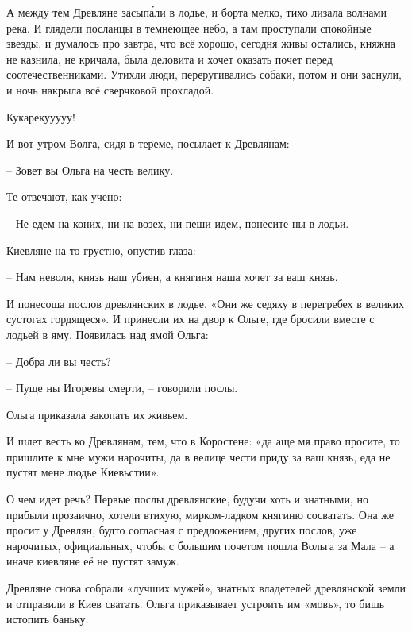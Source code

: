 А между тем Древляне засып\'али в лодье, и борта мелко, тихо лизала волнами река. И глядели посланцы в темнеющее небо, а там проступали спокойные звезды, и думалось про завтра, что всё хорошо, сегодня живы остались, княжна не казнила, не кричала, была деловита и хочет оказать почет перед соотечественниками. Утихли люди, переругивались собаки, потом и они заснули, и ночь накрыла всё сверчковой прохладой.

Кукарекууууу!

И вот утром Волга, сидя в тереме, посылает к Древлянам:

 – Зовет вы Ольга на честь велику.

Те отвечают, как учено:

 – Не едем на коних, ни на возех, ни пеши идем, понесите ны в лодьи.

Киевляне на то грустно, опустив глаза:

 – Нам неволя, князь наш убиен, а княгиня наша хочет за ваш князь.

И понесоша послов древлянских в лодье. «Они же седяху в перегребех в великих сустогах гордящеся». И принесли их на двор к Ольге, где бросили вместе с лодьей в яму. Появилась над ямой Ольга:

 – Добра ли вы честь?

 – Пуще ны Игоревы смерти, – говорили послы.

Ольга приказала закопать их живьем. 



И шлет весть ко Древлянам, тем, что в Коростене: «да аще мя право просите, то пришлите к мне мужи нарочиты, да в велице чести приду за ваш князь, еда не пустят мене людье Киевьстии».

О чем идет речь? Первые послы древлянские, будучи хоть и знатными, но прибыли прозаично, хотели втихую, мирком-ладком княгиню сосватать. Она же просит у Древлян, будто согласная с предложением, других послов, уже нарочитых, официальных, чтобы с большим почетом пошла Вольга за Мала – а иначе киевляне её не пустят замуж.

Древляне снова собрали «лучших мужей», знатных владетелей древлянской земли и отправили в Киев сватать. Ольга приказывает устроить им «мовь», то бишь истопить баньку.

